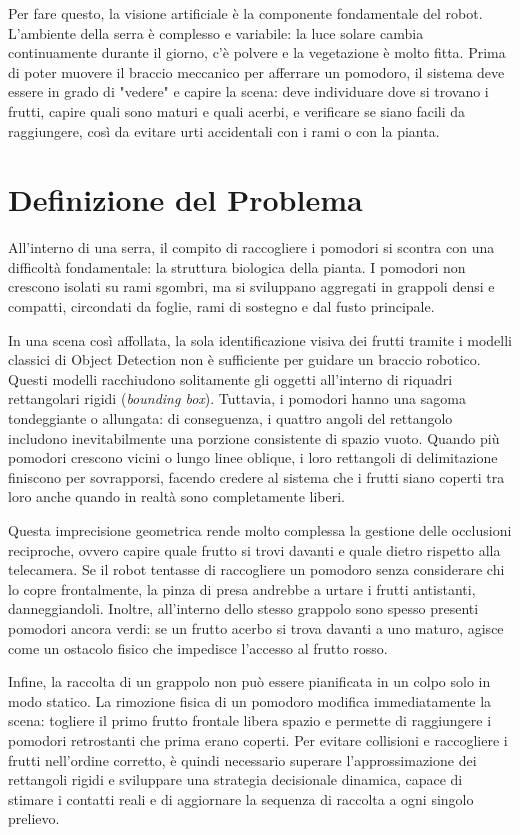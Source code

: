 Per fare questo, la visione artificiale è la componente fondamentale del robot. L'ambiente 
della serra è complesso e variabile: la luce solare cambia continuamente durante il giorno, 
c'è polvere e la vegetazione è molto fitta. Prima di poter muovere il braccio meccanico per 
afferrare un pomodoro, il sistema deve essere in grado di "vedere" e capire la scena: 
deve individuare dove si trovano i frutti, capire quali sono maturi e quali acerbi, e 
verificare se siano facili da raggiungere, così da evitare urti accidentali con i rami o con la pianta.


\section{Definizione del Problema}
\label{sec:definizione_problema}

All'interno di una serra, il compito di raccogliere i pomodori si scontra con 
una difficoltà fondamentale: la struttura biologica della pianta. I pomodori 
non crescono isolati su rami sgombri, ma si sviluppano aggregati in 
grappoli densi e compatti, circondati da foglie, rami di sostegno e dal fusto principale.

In una scena così affollata, la sola identificazione visiva dei frutti tramite i modelli 
classici di Object Detection non è sufficiente per guidare un braccio robotico. Questi 
modelli racchiudono solitamente gli oggetti all'interno di riquadri rettangolari rigidi 
(\textit{bounding box}). Tuttavia, i pomodori hanno una sagoma tondeggiante o allungata: 
di conseguenza, i quattro angoli del rettangolo includono inevitabilmente una porzione 
consistente di spazio vuoto. Quando più pomodori crescono vicini o lungo linee oblique, 
i loro rettangoli di delimitazione finiscono per sovrapporsi, facendo credere al sistema 
che i frutti siano coperti tra loro anche quando in realtà sono completamente liberi.

Questa imprecisione geometrica rende molto complessa la gestione delle occlusioni reciproche, 
ovvero capire quale frutto si trovi davanti e quale dietro rispetto alla telecamera. Se il 
robot tentasse di raccogliere un pomodoro senza considerare chi lo copre frontalmente, 
la pinza di presa andrebbe a urtare i frutti antistanti, danneggiandoli. Inoltre, all'interno 
dello stesso grappolo sono spesso presenti pomodori ancora verdi: se un frutto acerbo si trova 
davanti a uno maturo, agisce come un ostacolo fisico che impedisce l'accesso al frutto rosso.

Infine, la raccolta di un grappolo non può essere pianificata in un colpo solo in modo statico. 
La rimozione fisica di un pomodoro modifica immediatamente la scena: togliere il primo frutto 
frontale libera spazio e permette di raggiungere i pomodori retrostanti che prima erano coperti. 
Per evitare collisioni e raccogliere i frutti nell'ordine corretto, è quindi necessario superare 
l'approssimazione dei rettangoli rigidi e sviluppare una strategia decisionale dinamica, capace 
di stimare i contatti reali e di aggiornare la sequenza di raccolta a ogni singolo prelievo.


